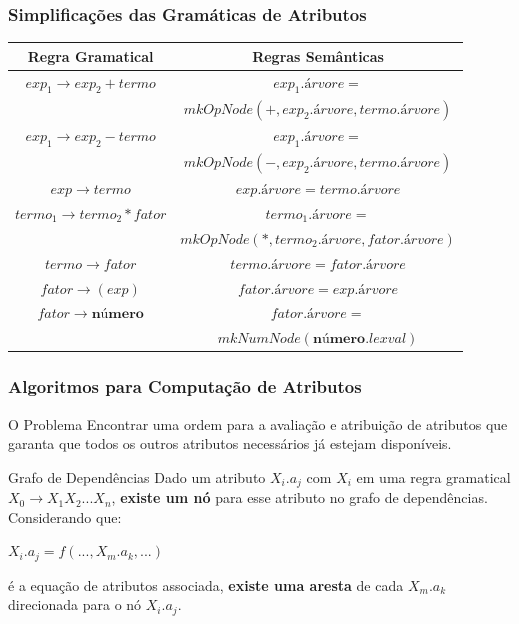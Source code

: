 \documentclass[table]{beamer}
\begin{document}
\begin{frame}
   \frametitle{Simplificações das Gramáticas de Atributos}
   \begin{table}
      \begin{tabular}{cc}
      Regra Gramatical & Regras Semânticas \\
      \hline 
      $exp_{1}\to exp_{2} + termo$ & $exp_{1}.\textit{árvore} = $ \\
                                   & $mkOpNode(+,exp_{2}.\textit{árvore}, termo.\textit{árvore}) $ \\
      $exp_{1}\to exp_{2} - termo$ & $exp_{1}.\textit{árvore} = $ \\
                                   & $mkOpNode(-,exp_{2}.\textit{árvore}, termo.\textit{árvore}) $ \\

      $exp\to termo$ & $exp.\textit{árvore} = termo.\textit{árvore} $ \\
      $termo_{1}\to termo_{2} * fator$ & $termo_{1}.\textit{árvore} =$ \\
                                       & $mkOpNode(*, termo_{2}.\textit{árvore}, fator.\textit{árvore})$ \\
      $termo\to fator$ & $termo.\textit{árvore} = fator.\textit{árvore} $ \\
      $fator\to (exp)$ & $fator.\textit{árvore} = exp.\textit{árvore} $ \\
      $fator\to \textbf{número}$ & $fator.\textit{árvore} = $ \\
                                 & $mkNumNode(\textbf{número}.lexval)$ \\
      \hline
      \end{tabular}
   \end{table}
\end{frame}

\begin{frame}
   \frametitle{Algoritmos para Computação de Atributos}
   \begin{block}{O Problema}
   Encontrar uma ordem para a avaliação e atribuição de atributos que garanta que todos os outros atributos necessários já estejam disponíveis.
   \end{block}
   \begin{block}{Grafo de Dependências}
   Dado um atributo $X_{i}.a_{j}$ com $X_{i}$ em uma regra gramatical $X_{0}\to X_{1}X_{2}...X_{n}$, \textbf{existe um nó} para esse atributo no grafo de dependências. Considerando que: \\
   \begin{center}
   $X_{i}.a_{j} = f(...,X_{m}.a_{k},...)$ \\
   \end{center}
   é a equação de atributos associada, \textbf{existe uma aresta} de cada $X_{m}.a_{k}$ direcionada para o nó $X_{i}.a_{j}$.
   \end{block}
\end{frame}
\end{document}

